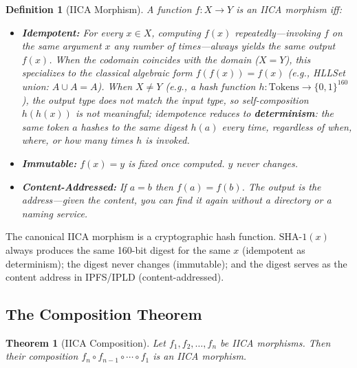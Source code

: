 \documentclass[11pt,a4paper]{article}
\newtheorem{theorem}{Theorem}[section]
\newtheorem{definition}{Definition}[section]
\theoremstyle{remark}
\begin{document}
\begin{definition}[IICA Morphism]
A function $f: X \to Y$ is an IICA morphism iff:
\begin{itemize}[leftmargin=*,nosep]
  \item \textbf{Idempotent:} For every $x \in X$, computing $f(x)$ repeatedly---invoking
    $f$ on the same argument $x$ any number of times---always yields the same output
    $f(x)$.  When the codomain coincides with the domain ($X = Y$), this specializes to
    the classical algebraic form $f(f(x)) = f(x)$ (e.g., HLLSet union:
    $A \cup A = A$).  When $X \neq Y$ (e.g., a hash function
    $h: \text{Tokens} \to \{0,1\}^{160}$), the output type does not match the input type,
    so self-composition $h(h(x))$ is not meaningful; idempotence reduces to
    \textbf{determinism}: the same token $a$ hashes to the same digest $h(a)$ every time,
    regardless of when, where, or how many times $h$ is invoked.
  \item \textbf{Immutable:} $f(x) = y$ is fixed once computed. $y$ never changes.
  \item \textbf{Content-Addressed:} If $a = b$ then $f(a) = f(b)$. The output
    \textit{is} the address---given the content, you can find it again without a
    directory or a naming service.
\end{itemize}
\end{definition}

The canonical IICA morphism is a cryptographic hash function. $\text{SHA-1}(x)$ always
produces the same 160-bit digest for the same $x$ (idempotent as determinism); the digest
never changes (immutable); and the digest serves as the content address in IPFS/IPLD
(content-addressed).

\subsection{The Composition Theorem}

\begin{theorem}[IICA Composition]
\label{thm:composition}
Let $f_1, f_2, \ldots, f_n$ be IICA morphisms. Then their composition
$f_n \circ f_{n-1} \circ \cdots \circ f_1$ is an IICA morphism.
\end{theorem}
\end{document}
